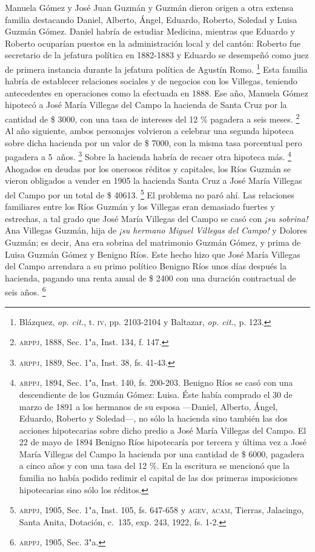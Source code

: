 \documentclass[14pt,twoside,final]{extbook} %
\let\oldfootnote\footnote
\renewcommand\footnote[1]{%
\oldfootnote{\hspace{1mm}#1}}
\begin{document}
Manuela Gómez y José Juan Guzmán y Guzmán dieron origen a otra extensa familia destacando Daniel, Alberto, Ángel, Eduardo, Roberto, Soledad y Luisa Guzmán Gómez. Daniel habría de estudiar Medicina, mientras que Eduardo y Roberto ocuparían puestos en la administración local y del cantón: Roberto fue secretario de la jefatura política en 1882-1883 y Eduardo se desempeñó como juez de primera instancia durante la jefatura política de Agustín Romo.\footnote{Blázquez, \emph{op. cit.}, t. \textsc{iv}, pp. 2103-2104 y Baltazar, \emph{op. cit.}, p. 123.} Esta familia habría de establecer relaciones sociales y de negocios con los Villegas, teniendo antecedentes en operaciones como la efectuada en 1888. Ese año, Manuela Gómez hipotecó a José María Villegas del Campo la hacienda de Santa Cruz por la cantidad de \$ 3000, con una tasa de intereses del 12 \% pagadera a seis meses.\footnote{\textsc{arppj}, 1888, Sec. 1"a, Inst. 134, f. 147.} Al año siguiente, ambos personajes volvieron a celebrar una segunda hipoteca sobre dicha hacienda por un valor de \$ 7000, con la misma tasa porcentual pero pagadera a 5~años.\footnote{\textsc{arppj}, 1889, Sec. 1"a, Inst. 38, fs. 41-43.} Sobre la hacienda habría de recaer otra hipoteca más.\footnote{\textsc{arppj}, 1894, Sec. 1"a, Inst. 140, fs. 200-203. Benigno Ríos se casó con una descendiente de los Guzmán Gómez: Luisa. Éste había comprado el 30 de marzo de 1891 a los hermanos de su esposa ---Daniel, Alberto, Ángel, Eduardo, Roberto y Soledad---, no sólo la hacienda sino también las dos acciones hipotecarias sobre dicho predio a José María Villegas del Campo. El 22 de mayo de 1894 Benigno Ríos hipotecaría por tercera y última vez a José María Villegas del Campo la hacienda por una cantidad de \$ 6000, pagadera a cinco años y con una tasa del 12 \%. En la escritura se mencionó que la familia no había podido redimir el capital de las dos primeras imposiciones hipotecarias sino sólo los réditos.} Ahogados en deudas por los onerosos réditos y capitales, los Ríos Guzmán se vieron obligados a vender en 1905 la hacienda Santa Cruz a José María Villegas del Campo por un total de \$ 40613.\footnote{\textsc{arppj}, 1905, Sec. 1"a, Inst. 105, fs. 647-658 y \textsc{agev, acam}, Tierras, Jalacingo, Santa Anita, Dotación, c.~135, exp. 243, 1922, fs. 1-2.} El problema no paró ahí. Las relaciones familiares entre los Ríos Guzmán y los Villegas eran demasiado fuertes y estrechas, a tal grado que José María Villegas del Campo se casó con \emph{¡su sobrina!} Ana Villegas Guzmán, hija de \emph{¡su hermano Miguel Villegas del Campo!} y Dolores Guzmán; es decir, Ana era sobrina del matrimonio Guzmán Gómez, y prima de Luisa Guzmán Gómez y Benigno Ríos. Este hecho hizo que José María Villegas del Campo arrendara a su primo político Benigno Ríos unos días después la hacienda, pagando una renta anual de \$ 2400 con una duración contractual de seis años.\footnote{\textsc{arppj}, 1905, Sec. 3"a.}
\end{document}

